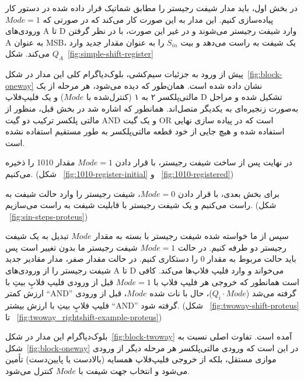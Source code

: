 \documentclass[12pt]{article}
\begin{document}
در بخش اول، باید مدار شیفت رجیستر را مطابق شماتیک قرار داده شده در دستور کار پیاده‌سازی کنیم. این مدار به این صورت کار می‌کند که در صورتی که $Mode = 1$ ورودی‌های A تا D وارد شیفت رجیستر می‌شوند و در غیر این صورت، با در نظر گرفتن A به عنوان MSB، یک شیفت به راست می‌دهد و بیت $S_{in}$ را به عنوان مقدار جدید وارد $Q_{A}$ می‌کند. شکل~\ref{fig:simple-shift-register}

پیش از ورود به جزئیات سیم‌کشی، بلوک‌دیاگرام کلی این مدار در شکل~\ref{fig:block-oneway} نشان داده شده است. همان‌طور که دیده می‌شود، هر مرحله از یک مالتی‌پلکسر ۲ به ۱ (کنترل‌شده با $Mode$) و یک فلیپ‌فلاپ D تشکیل شده و مراحل به‌صورت زنجیره‌ای به یکدیگر متصل‌اند. همانطور که اشاره شد در بخش قبل، منظور از مالتی پلکسر ترکیب دو گیت AND و یک گیت OR است که در پیاده سازی نهایی استفاده شده و هیچ جایی از خود قطعه مالتی‌پلکسر به طور مستقیم استفاده نشده است.

در نهایت پس از ساخت شیفت رجیستر، با قرار دادن $Mode = 1$ مقدار 1010 را ذخیره می‌کنیم. (شکل ~\ref{fig:1010-register-initial} و ~\ref{fig:1010-registered})


برای بخش بعدی، با قرار دادن $Mode = 0$، شیفت رجیستر را وارد حالت شیفت به راست می‌کنیم و یک شیفت رجیستر با قابلیت شیفت به راست می‌سازیم. (شکل ~\ref{fig:sin-steps-proteus})


سپس از ما خواسته شده شیفت رجیستر با بسته به مقدار $Mode$ تبدیل به یک شیفت رجیستر دو طرفه کنیم. در حالت $Mode = 1$ شیفت رجیستر ما بدون تغییر است پس باید حالت مربوط به مقدار 0 را دستکاری کنیم. در حالت مقدار صفر، مدار مقادیر جدید شیفت رجیستر را از ورودی‌های A تا D می‌خواند و وارد فلیپ فلاپ‌ها می‌کند. کافی است همانطور که خروجی هر فلیپ فلاپ با $Mode = 1$ قبل از ورودی فلیپ فلاپِ بیتِ با ارزش کمتر ``AND'' گرفته می‌شد ($Q_{i} \cdot Mode$)، حال با نات شده $Mode$، قبل از ورودی فلیپ فلاپِ بیتِ با ارزش بیشتر ``AND'' گرفته شود. (شکل ~\ref{fig:twoway-shift-proteus} تا ~\ref{fig:twoway_rightshift-example-proteus})

بلوک‌دیاگرام این مدار در شکل~\ref{fig:block-twoway} آمده است. تفاوت اصلی نسبت به شکل~\ref{fig:block-oneway} در این است که ورودی مالتی‌پلکسر هر مرحله دیگر از ورودی موازی مستقل، بلکه از خروجی فلیپ‌فلاپ همسایه (بالادست یا پایین‌دست) تأمین می‌شود و انتخاب جهت شیفت با $Mode$ کنترل می‌شود.

\clearpage
\end{document}
